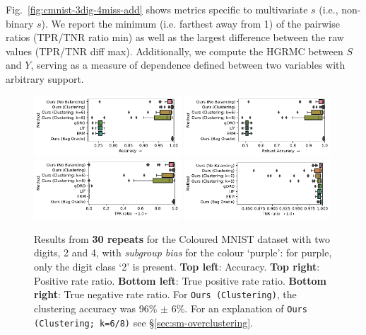 Fig.~\ref{fig:cmnist-3dig-4miss-add} shows metrics specific to multivariate $s$ (i.e., non-binary
$s$). 
%
We report the minimum (i.e. farthest away from 1) of the pairwise ratios (\ac{TPR}/\ac{TNR} ratio
min) as well as the largest difference between the raw values (\ac{TPR}/\ac{TNR} diff max). 
%
Additionally, we compute the \ac{HGRMC} between $S$ and $Y$, serving as a measure of dependence
defined between two variables with arbitrary support.
%
\begin{figure}[htp]
  \centering
  \includegraphics[width=0.49\textwidth]{supmatch/figures/cmnist/subgroup_bias_oc/cmnist_2v4_partial_overcluster_acc.pdf}
  \includegraphics[width=0.49\textwidth]{supmatch/figures/cmnist/subgroup_bias_oc/cmnist_2v4_partial_overcluster_acc-min.pdf}
  \includegraphics[width=0.49\textwidth]{supmatch/figures/cmnist/subgroup_bias_oc/cmnist_2v4_partial_overcluster_tprr.pdf}
    \includegraphics[width=0.49\textwidth]{supmatch/figures/cmnist/subgroup_bias_oc/cmnist_2v4_partial_overcluster_tnrr.pdf}
  \caption{
    Results from \textbf{30 repeats} for the Coloured MNIST dataset with two digits, 2 and 4, with
    \emph{subgroup bias} for the colour `{\color{purple}purple}': for {\color{purple}purple}, only
    the digit class `2' is present.
    \textbf{Top left}: Accuracy.
    \textbf{Top right}: Positive rate ratio.
    \textbf{Bottom left}: True positive rate ratio.
    \textbf{Bottom right}: True negative rate ratio.
    For \texttt{Ours (Clustering)}, the clustering accuracy was 96\% $\pm$ 6\%.
    For an explanation of \texttt{Ours (Clustering; k=6/8)} see \S\ref{sec:sm-overclustering}.
  }%
  \label{fig:cmnist-2v4-partial-add}
\end{figure}
